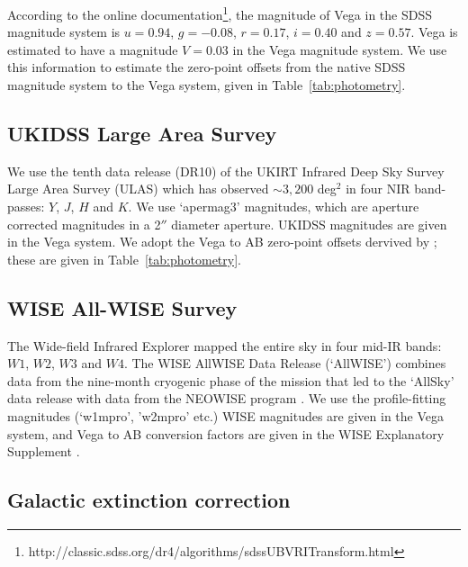 According to the online documentation\footnote{http://classic.sdss.org/dr4/algorithms/sdssUBVRITransform.html}, the magnitude of Vega in the SDSS magnitude system is $u=0.94$, $g=-0.08$, $r=0.17$, $i=0.40$ and $z=0.57$. 
Vega is estimated to have a magnitude $V=0.03$ in the Vega magnitude system. 
We use this information to estimate the zero-point offsets from the native SDSS magnitude system to the Vega system, given in Table~\ref{tab:photometry}. 

\subsection{UKIDSS Large Area Survey}

We use the tenth data release (DR10) of the UKIRT Infrared Deep Sky Survey \citep[UKIDSS;][]{lawrence07} Large Area Survey (ULAS) which has observed $\sim 3,200$ deg$^2$ in four NIR band-passes: $Y$, $J$, $H$ and $K$. 
We use `apermag3' magnitudes, which are aperture corrected magnitudes in a 2$''$ diameter aperture.
UKIDSS magnitudes are given in the Vega system. 
We adopt the Vega to AB zero-point offsets dervived by \citet{hewett06}; these are given in Table~\ref{tab:photometry}. 

\subsection{WISE All-WISE Survey}

The Wide-field Infrared Explorer \citep[WISE;][]{wright10} mapped the entire sky in four mid-IR bands: $W1$, $W2$, $W3$ and $W4$. 
The WISE AllWISE Data Release (`AllWISE') combines data from the nine-month cryogenic phase of the mission that led to the `AllSky' data release with data from the NEOWISE program \citep{mainzer11}. 
We use the profile-fitting magnitudes (`w1mpro', 'w2mpro' etc.) 
WISE magnitudes are given in the Vega system, and Vega to AB conversion factors are given in the WISE Explanatory Supplement \citep{cutri13}.

\subsection{Galactic extinction correction}



